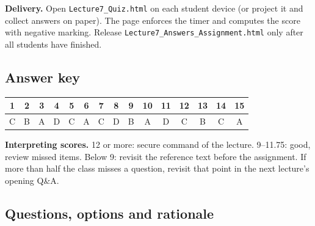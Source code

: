 \documentclass[11pt]{article}
\begin{document}
\textbf{Delivery.} Open \texttt{Lecture7\_Quiz.html} on each student device (or project it and collect answers on paper). The page enforces the timer and computes the score with negative marking. Release \texttt{Lecture7\_Answers\_Assignment.html} only after all students have finished.

\subsection*{Answer key}\begin{center}\small\renewcommand{\arraystretch}{1.3}\begin{tabular}{|c|c|c|c|c|c|c|c|c|c|c|c|c|c|c|}\hline \textbf{1} & \textbf{2} & \textbf{3} & \textbf{4} & \textbf{5} & \textbf{6} & \textbf{7} & \textbf{8} & \textbf{9} & \textbf{10} & \textbf{11} & \textbf{12} & \textbf{13} & \textbf{14} & \textbf{15}\\\hline C & B & A & D & C & A & C & D & B & A & D & C & B & C & A\\\hline\end{tabular}\end{center}

\textbf{Interpreting scores.} 12 or more: secure command of the lecture. 9--11.75: good, review missed items. Below 9: revisit the reference text before the assignment. If more than half the class misses a question, revisit that point in the next lecture's opening Q\&A.

\subsection*{Questions, options and rationale}
\end{document}
